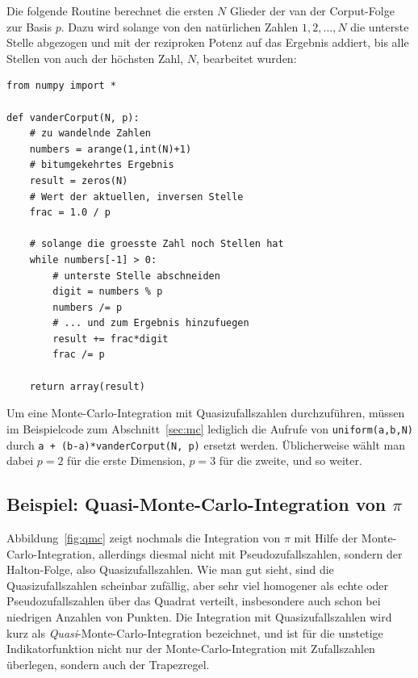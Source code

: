 Die folgende Routine berechnet die ersten $N$ Glieder der van der
Corput-Folge zur Basis $p$. Dazu wird solange von den natürlichen
Zahlen $1,2,\ldots,N$ die unterste Stelle abgezogen und mit der
reziproken Potenz auf das Ergebnis addiert, bis alle Stellen von auch
der höchsten Zahl, $N$, bearbeitet wurden:
\begin{lstlisting}
from numpy import *

def vanderCorput(N, p):
    # zu wandelnde Zahlen
    numbers = arange(1,int(N)+1)
    # bitumgekehrtes Ergebnis
    result = zeros(N)
    # Wert der aktuellen, inversen Stelle
    frac = 1.0 / p

    # solange die groesste Zahl noch Stellen hat
    while numbers[-1] > 0:
        # unterste Stelle abschneiden
        digit = numbers % p
        numbers /= p
        # ... und zum Ergebnis hinzufuegen
        result += frac*digit
        frac /= p

    return array(result)
\end{lstlisting}
Um eine Monte-Carlo-Integration mit Quasizufallszahlen durchzuführen,
müssen im Beispielcode zum Abschnitt~\ref{sec:mc} lediglich die
Aufrufe von \lstinline!uniform(a,b,N)! durch
\lstinline!a + (b-a)*vanderCorput(N, p)! ersetzt werden. Üblicherweise
wählt man dabei $p=2$ für die erste Dimension, $p=3$ für die zweite,
und so weiter.

\subsection{Beispiel: Quasi-Monte-Carlo-Integration von $\pi$}

Abbildung~\ref{fig:qmc} zeigt nochmals die Integration von $\pi$ mit
Hilfe der Monte-Carlo-Integration, allerdings diesmal nicht mit
Pseudozufallszahlen, sondern der Halton-Folge, also
Quasizufallszahlen. Wie man gut sieht, sind die Quasizufallszahlen
scheinbar zufällig, aber sehr viel homogener als echte oder
Pseudozufallszahlen über das Quadrat verteilt, insbesondere auch schon
bei niedrigen Anzahlen von Punkten.  Die Integration mit
Quasizufallszahlen wird kurz als \emph{Quasi}-Monte-Carlo-Integration
bezeichnet, und ist für die unstetige Indikatorfunktion nicht nur der
Monte-Carlo-Integration mit Zufallszahlen überlegen, sondern auch der
Trapezregel.

